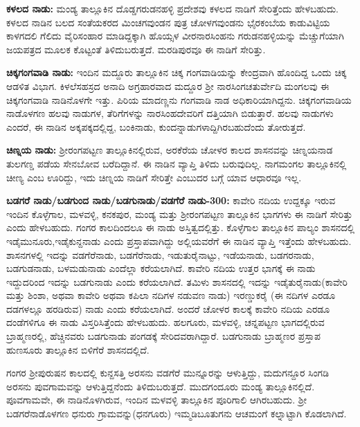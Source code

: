 \textbf{ಕಳಲದ ನಾಡು:} ಮಂಡ್ಯ ತಾಲ್ಲೂಕಿನ ದೊಡ್ಡಗರುಡನಹಳ್ಳಿ ಪ್ರದೇಶವು ಕಳಲದ ನಾಡಿಗೆ ಸೇರಿತ್ತೆಂದು ಹೇಳಬಹುದು. ಕಳಲದ ನಾಡಿನ ಬಲದ ಸಂತೆಯಕರದ ಮಿಂಚಗವುಂಡನ ಪುತ್ರ ಚೋಳಗವುಂಡನು ಭೈರಕಂಬೆಯ ಕಾಡುವಿಟ್ಟಿಯ ಕಾಳಗದಲಿ ಗೆಲಿದು ವೈರಿಸಂಹಾರ ಮಾಡಿದ್ದಕ್ಕಾಗಿ ಹೊಯ್ಸಳ ವೀರನಾರಸಿಂಹನು ಗರುಡನಹಳ್ಳಿಯನ್ನು ಮೆಚ್ಚುಗೆಯಾಗಿ ಜಯಪತ್ರದ ಮೂಲಕ ಕೊಟ್ಟಂತೆ ತಿಳಿದುಬರುತ್ತದೆ. ಮರಡಿಪುರವೂ ಈ ನಾಡಿಗೆ ಸೇರಿತ್ತು.

\newpage

\textbf{ಚಿಕ್ಕಗಂಗವಾಡಿ ನಾಡು:} ಇಂದಿನ ಮದ್ದೂರು ತಾಲ್ಲೂಕಿನ ಚಿಕ್ಕ ಗಂಗವಾಡಿಯನ್ನು ಕೇಂದ್ರವಾಗಿ ಹೊಂದಿದ್ದ ಒಂದು ಚಿಕ್ಕ ಆಡಳಿತ ವಿಭಾಗ. ಕಿಳಲೆಸಹಸ್ರದ ಅನಾದಿ ಅಗ್ರಹಾರವಾದ ಮದ್ದೂರ ಶ‍್ರೀ ನಾರಸಿಂಗಚತುರ್ವೇದಿ ಮಂಗಲವು ಈ ಚಿಕ್ಕಗಂಗವಾಡಿ ನಾಡಿನೊಳಗೇ ಇತ್ತು. ಪಿರಿಯ ಮಾದಣ್ಣನು ಗಂಗವಾಡಿ ನಾಡ ಅಧಿಕಾರಿಯಾಗಿದ್ದನು. ಚಿಕ್ಕಗಂಗವಾಡಿಯ ನಾಡೊಳಗಣ ಹಲವು ನಾಡುಗಳ, ತೆರಿಗೆಗಳನ್ನು ನಾರಸಿಂಹದೇವರಿಗೆ ದತ್ತಿಯಾಗಿ ಬಿಡುತ್ತಾರೆ. ಹಲವು ನಾಡುಗಳು ಎಂದರೆ, ಈ ನಾಡಿನ ಅಕ್ಕಪಕ್ಕದಲ್ಲಿದ್ದ, ಬಂಕಿನಾಡು, ಕುಂದನ್ನಾಡುಗಳಾದ್ದಿಗಿರಬಹುದೆಂದು ತೋರುತ್ತದೆ.

\textbf{ಚಿಣ್ನಯ ನಾಡು:} ಶ‍್ರೀರಂಗಪಟ್ಟಣ ತಾಲ್ಲೂಕಿನಲ್ಲಿರುವ, ಅರಕೆರೆಯ ಚೋಳರ ಕಾಲದ ಶಾಸನವನ್ನು ಚಿಣ್ನಯನಾಡ ತುಲಗಣ್ಡ ಪಡೆಯ ಸೇನಬೋವ ಬರೆದಿದ್ದಾನೆ. ಈ ನಾಡಿನ ವ್ಯಾಪ್ತಿ ತಿಳಿದು ಬರುವುದಿಲ್ಲ. ನಾಗಮಂಗಲ ತಾಲ್ಲೂಕಿನಲ್ಲಿ ಚೀಣ್ಯ ಎಂಬ ಊರಿದ್ದು, ಇದು ಚಿಣ್ನಯ ನಾಡಿಗೆ ಸೇರಿತ್ತೇ ಎಂಬುದರ ಬಗ್ಗೆ ಯಾವ ಆಧಾರವೂ ಇಲ್ಲ.

\textbf{ಬಡಗರೆ ನಾಡು/ಬಡಗುಂದ ನಾಡು/ಬಡಗುನಾಡು/ವಡಗೆರೆ ನಾಡು-300:} ಕಾವೇರಿ ನದಿಯ ಉದ್ದಕ್ಕೂ ಇರುವ ಇಂದಿನ ಕೊಳ್ಳೆಗಾಲ, ಮಳವಳ್ಳಿ, ಕನಕಪುರ, ಮಂಡ್ಯ ಮತ್ತು ಶ‍್ರೀರಂಗಪಟ್ಟಣ ತಾಲ್ಲೂಕಿನ ಭಾಗಗಳು ಈ ನಾಡಿಗೆ ಸೇರಿತ್ತು ಎಂದು ಹೇಳಬಹುದು. ಗಂಗರ ಕಾಲದಿಂದಲೂ ಈ ನಾಡು ಅಸ್ತಿತ್ವದಲ್ಲಿತ್ತು. ಕೊಳ್ಳೆಗಾಲ ತಾಲ್ಲೂಕಿನ ಪಾಲ್ಯಂ ಶಾಸನದಲ್ಲಿ ಇಡೈಮುನೂರು,ಇಡೈಕುನ್ದನಾಡು ಎಂದು ಪ್ರಸ್ತಾಪವಾಗಿದ್ದು ಅಲ್ಲಿಯವರೆಗೆ ಈ ನಾಡಿನ ವ್ಯಾಪ್ತಿ ಇತ್ತೆಂದು ಹೇಳಬಹುದು. ಶಾಸನಗಳಲ್ಲಿ ಇದನ್ನು ವಡಗೆರೆನಾಡು, ಬಡಗೆರೆನಾಡು, ಇಡುತುರೈನಾಟ್ಟು, ಇಡೆಯನಾಡು, ಬಡಗರನಾಡು, ಬಡಗುಡನಾಡು, ಬಳಮಡುನಾಡು ಎಂದೆಲ್ಲಾ ಕರೆಯಲಾಗಿದೆ. ಕಾವೇರಿ ನದಿಯ ಉತ್ತರ ಭಾಗಕ್ಕೆ ಈ ನಾಡು ಇದ್ದುದರಿಂದ ಇದನ್ನು ಬಡಗುನಾಡು ಎಂದು ಕರೆಯಲಾಗಿದೆ. ತಮಿಳು ಶಾಸನದಲ್ಲಿ ಇದನ್ನು ಇಡೈತುರೈನಾಡು(ಕಾವೇರಿ ಮತ್ತು ಶಿಂಶಾ, ಅಥವಾ ಕಾವೇರಿ ಅಥವಾ ಕಪಿಲಾ ನದಿಗಳ ನಡುವಣ ನಾಡು) ಇರಣ್ಡುಕರೈ (ಈ ನದಿಗಳ ಎರಡೂ ದಡಗಳಲ್ಲೂ ಹರಡಿರುವ) ನಾಡು ಎಂದು ಕರೆಯಲಾಗಿದೆ. ಅಂದರೆ ಚೋಳರ ಕಾಲಕ್ಕೆ ಕಾವೇರಿ ನದಿಯ ಎರಡೂ ದಂಡೆಗಳಿಗೂ ಈ ನಾಡು ವಿಸ್ತರಿಸಿತ್ತೆಂದು ಹೇಳಬಹುದು. ಹಲಗೂರು, ಮಳವಳ್ಳಿ, ಚನ್ನಪಟ್ಟಣ ಭಾಗದಲ್ಲಿರುವ ಬ್ರಾಹ್ಮಣರಲ್ಲಿ, ಹೆಚ್ಚಿನವರು ಬಡಗುನಾಡು ಪಂಗಡಕ್ಕೆ ಸೇರಿದವರಾಗಿದ್ದಾರೆ. ಬಡಗುನಾಡು ಬ್ರಾಹ್ಮಣರ ಪ್ರಸ್ತಾಪ ಹುಣಸೂರು ತಾಲ್ಲೂಕಿನ ಬಿಳಿಗೆರೆ ಶಾಸನದಲ್ಲಿದೆ.

ಗಂಗರ ಶ‍್ರೀಪುರುಷನ ಕಾಲದಲ್ಲಿ ಕುನ್ದಸತ್ತಿ ಅರಸನು ವಡಗೆರೆ ಮುನ್ನೂರನ್ನು ಆಳುತ್ತಿದ್ದು, ಮದುಗನ್ದೂರ ಸಿಂಗಡಿ ಅರಸನು ಪುವಗಾಮವನ್ನು ಆಳುತ್ತಿದ್ದನೆಂದು ತಿಳಿದುಬರುತ್ತದೆ. ಮುದಗಂದೂರು ಮಂಡ್ಯ ತಾಲ್ಲೂಕಿನಲ್ಲಿದೆ. ಪೂವಗಾಮವೇ, ಈ ನಾಡಿನೊಳಗಿರುವ, ಇಂದಿನ ಮಳವಳ್ಳಿ ತಾಲ್ಲೂಕಿನ ಪೂರಿಗಾಲಿ ಆಗಿರಬಹುದು. ಶ‍್ರೀ ಬಡಗರೆನಾಡೊಳಗಣ ಧನುರು ಗ್ರಾಮವನ್ನು(ಧನಗೂರು) ಇಮ್ಮಡಿಬೂತುಗನು ಆಚಮಂಗೆ ಕಲ್ನಾಟ್ಟಾಗಿ ಕೊಡಲಾಗಿದೆ.

